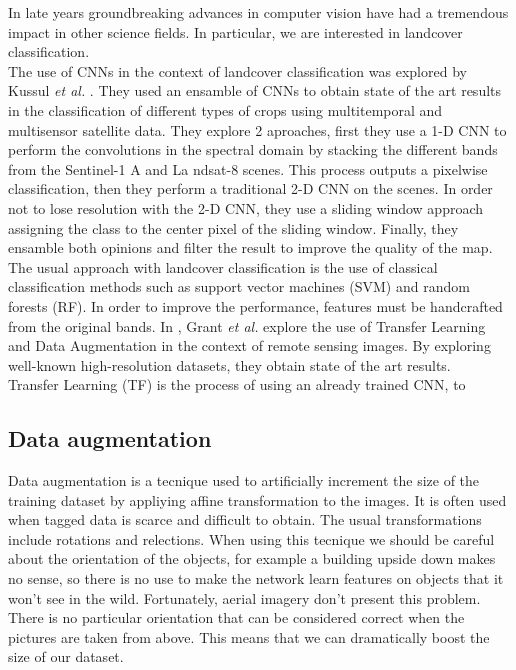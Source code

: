 In late years groundbreaking advances in computer vision have had a tremendous impact in other science fields. In particular, we are interested in landcover classification.\\


The use of CNNs in the context of landcover classification was explored by Kussul \textit{et al.} \cite{kussul}. They used an ensamble of CNNs to obtain state of the art results in the classification of different types of crops using multitemporal and multisensor satellite data. They explore 2 aproaches, first they use a 1-D CNN to perform the convolutions in the spectral domain by stacking the different bands from the Sentinel-1 A and La ndsat-8 scenes. This process outputs a pixelwise classification, then they perform a traditional 2-D CNN on the scenes. In order not to lose resolution with the 2-D CNN, they use a sliding window approach assigning the class to the center pixel of the sliding window. Finally, they ensamble both opinions and filter the result to improve the quality of the map.\\

The usual approach with landcover classification is the use of classical classification methods such as support vector machines (SVM) and random forests (RF). In order to improve the performance, features must be handcrafted from the original bands. In \cite{scott}, Grant \textit{et al.} explore the use of Transfer Learning and Data Augmentation in the context of remote sensing images. By exploring well-known high-resolution datasets, they obtain state of the art results.\\

Transfer Learning (TF) is the process of using an already trained CNN, to 

\subsection{Data augmentation}

Data augmentation is a tecnique used to artificially increment the size of the training dataset by appliying affine transformation to the images. It is often used when tagged data is scarce and difficult to obtain. The usual transformations include rotations and relections. When using this tecnique we should be careful about the orientation of the objects, for example a building upside down makes no sense, so there is no use to make the network learn features on objects that it won't see in the wild. Fortunately, aerial imagery don't present this problem. There is no particular orientation that can be considered correct when the pictures are taken from above. This means that we can dramatically boost the size of our dataset.\\

